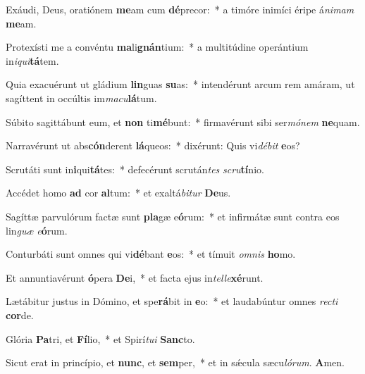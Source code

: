 \item Exáudi, Deus, oratiónem \textbf{me}am cum \textbf{dé}precor:~* a timóre inimíci éripe á\textit{ni}\textit{mam} \textbf{me}am.
\item Protexísti me a convéntu \textbf{ma}li\textbf{gnán}tium:~* a multitúdine operántium in\textit{i}\textit{qui}\textbf{tá}tem.
\item Quia exacuérunt ut gládium \textbf{lin}guas \textbf{su}as:~* intendérunt arcum rem amáram, ut sagíttent in occúltis im\textit{ma}\textit{cu}\textbf{lá}tum.
\item Súbito sagittábunt eum, et \textbf{non} ti\textbf{mé}bunt:~* firmavérunt sibi ser\textit{mó}\textit{nem} \textbf{ne}quam.
\item Narravérunt ut abs\textbf{cón}derent \textbf{lá}queos:~* dixérunt: Quis vi\textit{dé}\textit{bit} \textbf{e}os?
\item Scrutáti sunt in\textbf{i}qui\textbf{tá}tes:~* defecérunt scrután\textit{tes} \textit{scru}\textbf{tí}nio.
\item Accédet homo \textbf{ad} cor \textbf{al}tum:~* et exaltá\textit{bi}\textit{tur} \textbf{De}us.
\item Sagíttæ parvulórum factæ sunt \textbf{pla}gæ e\textbf{ó}rum:~* et infirmátæ sunt contra eos lin\textit{guæ} \textit{e}\textbf{ó}rum.
\item Conturbáti sunt omnes qui vi\textbf{dé}bant \textbf{e}os:~* et tímuit \textit{om}\textit{nis} \textbf{ho}mo.
\item Et annuntiavérunt \textbf{ó}pera \textbf{De}i,~* et facta ejus in\textit{tel}\textit{le}\textbf{xé}runt.
\item Lætábitur justus in Dómino, et spe\textbf{rá}bit in \textbf{e}o:~* et laudabúntur omnes \textit{rec}\textit{ti} \textbf{cor}de.
\item Glória \textbf{Pa}tri, et \textbf{Fí}lio,~* et Spirí\textit{tu}\textit{i} \textbf{Sanc}to.
\item Sicut erat in princípio, et \textbf{nunc}, et \textbf{sem}per,~* et in sǽcula sæcu\textit{ló}\textit{rum}. \textbf{A}men.
